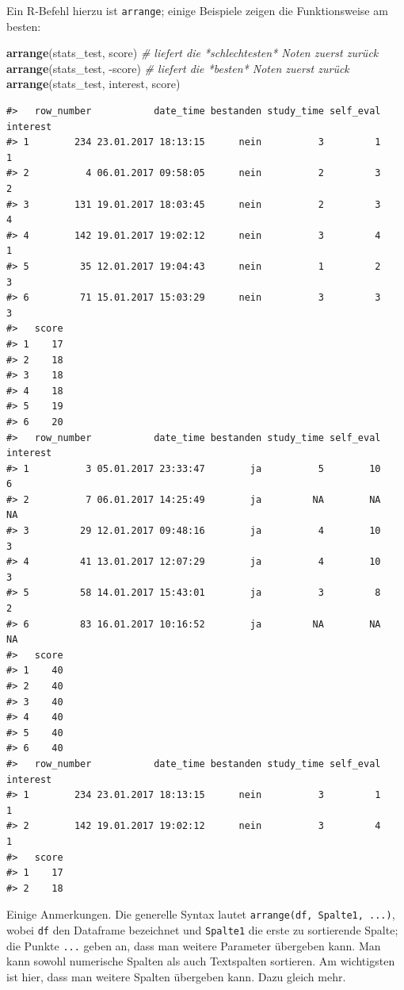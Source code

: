 \documentclass[12pt,ngerman,]{book}
\makeatletter
\newenvironment{Shaded}{\begin{snugshade}}{\end{snugshade}}
\newcommand{\KeywordTok}[1]{\textcolor[rgb]{0.13,0.29,0.53}{\textbf{{#1}}}}
\newcommand{\CommentTok}[1]{\textcolor[rgb]{0.56,0.35,0.01}{\textit{{#1}}}}
\newcommand{\NormalTok}[1]{{#1}}
\newenvironment{kframe}{%
\medskip{}
\setlength{\fboxsep}{.8em}
 \def\at@end@of@kframe{}%
 \ifinner\ifhmode%
  \def\at@end@of@kframe{\end{minipage}}%
  \begin{minipage}{\columnwidth}%
 \fi\fi%
 \def\FrameCommand##1{\hskip\@totalleftmargin \hskip-\fboxsep
 \colorbox{shadecolor}{##1}\hskip-\fboxsep
     \hskip-\linewidth \hskip-\@totalleftmargin \hskip\columnwidth}%
 \MakeFramed {\advance\hsize-\width
   \@totalleftmargin\z@ \linewidth\hsize
   \@setminipage}}%
 {\par\unskip\endMakeFramed%
 \at@end@of@kframe}
\renewenvironment{Shaded}{\begin{kframe}}{\end{kframe}}
\theoremstyle{definition}
\theoremstyle{definition}
\theoremstyle{remark}
\makeatother
\begin{document}
Ein R-Befehl hierzu ist \texttt{arrange}; einige
Beispiele zeigen die Funktionsweise am besten:

\begin{Shaded}
\begin{Highlighting}[]

\KeywordTok{arrange}\NormalTok{(stats_test, score) }\CommentTok{# liefert die *schlechtesten* Noten zuerst zurück}
\KeywordTok{arrange}\NormalTok{(stats_test, -score) }\CommentTok{# liefert die *besten* Noten zuerst zurück}
\KeywordTok{arrange}\NormalTok{(stats_test, interest, score)}
\end{Highlighting}
\end{Shaded}

\begin{verbatim}
#>   row_number           date_time bestanden study_time self_eval interest
#> 1        234 23.01.2017 18:13:15      nein          3         1        1
#> 2          4 06.01.2017 09:58:05      nein          2         3        2
#> 3        131 19.01.2017 18:03:45      nein          2         3        4
#> 4        142 19.01.2017 19:02:12      nein          3         4        1
#> 5         35 12.01.2017 19:04:43      nein          1         2        3
#> 6         71 15.01.2017 15:03:29      nein          3         3        3
#>   score
#> 1    17
#> 2    18
#> 3    18
#> 4    18
#> 5    19
#> 6    20
#>   row_number           date_time bestanden study_time self_eval interest
#> 1          3 05.01.2017 23:33:47        ja          5        10        6
#> 2          7 06.01.2017 14:25:49        ja         NA        NA       NA
#> 3         29 12.01.2017 09:48:16        ja          4        10        3
#> 4         41 13.01.2017 12:07:29        ja          4        10        3
#> 5         58 14.01.2017 15:43:01        ja          3         8        2
#> 6         83 16.01.2017 10:16:52        ja         NA        NA       NA
#>   score
#> 1    40
#> 2    40
#> 3    40
#> 4    40
#> 5    40
#> 6    40
#>   row_number           date_time bestanden study_time self_eval interest
#> 1        234 23.01.2017 18:13:15      nein          3         1        1
#> 2        142 19.01.2017 19:02:12      nein          3         4        1
#>   score
#> 1    17
#> 2    18
\end{verbatim}

Einige Anmerkungen. Die generelle Syntax lautet
\texttt{arrange(df,\ Spalte1,\ ...)}, wobei \texttt{df} den Dataframe
bezeichnet und \texttt{Spalte1} die erste zu sortierende Spalte; die
Punkte \texttt{...} geben an, dass man weitere Parameter übergeben kann.
Man kann sowohl numerische Spalten als auch Textspalten sortieren. Am
wichtigsten ist hier, dass man weitere Spalten übergeben kann. Dazu
gleich mehr.
\end{document}
